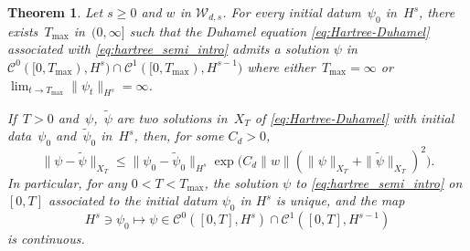 \documentclass[12pt]{article}
\theoremstyle{plain}
\newtheorem{theo}{Theorem}[section]
\newcommand{\setW}{{\mathcal{W}_{d,s}}}
\begin{document}
\begin{theo}
\label{th: local H^s} Let $s\geq0$ and $w$ in $\setW$. For every initial datum~$\psi_{0}$ in~$H^{s}$, there exists~$T_{\max}$ in~$(0,\infty]$ such that the Duhamel equation \eqref{eq:Hartree-Duhamel}
associated with \eqref{eq:hartree_semi_intro} admits a solution $\psi$ in~$\mathcal{C}^{0}([0,T_{\max}),H^{s})\cap \mathcal{C}^{1}([0,T_{\max}),H^{s-1})$ where either~$T_{\max}=\infty$ or~$\lim_{t\to T_{\max}}\|\psi_t\|_{H^s} = \infty$.

If~$T>0$ and~$\psi$,~$\tilde{\psi}$ are two solutions in~$X_{T}$ of \eqref{eq:Hartree-Duhamel} with initial data~$\psi_0$ and~$\tilde{\psi}_0$ in~$H^s$, then, for some $C_d>0$,
\begin{equation}\label{eqn:comparaison-solutions-Hartree}
    \|\psi-\tilde{\psi}\|_{X_{T}}
    \leq \|\psi_{0}-\tilde{\psi}_{0}\|_{H^{s}}\exp\big(C_d\|w\|(\|\psi\|_{X_{T}}+\|\tilde{\psi}\|_{X_{T}})^{2}\big).
\end{equation}
In particular, for any $0<T<T_{\max}$, the solution $\psi$ to \eqref{eq:hartree_semi_intro} on $[0,T]$ associated to the initial datum $\psi_0$ in $H^s$ is unique, and the map
\begin{equation*}
    H^s\ni\psi_0\mapsto\psi\in\mathcal{C}^{0}([0,T],H^{s})\cap \mathcal{C}^{1}([0,T],H^{s-1})
\end{equation*}
is continuous.
\end{theo}
\end{document}
